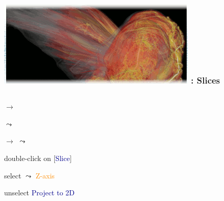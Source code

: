 \begin{frame}
\frametitle{\href{https://wci.llnl.gov/simulation/computer-codes/visit/}{\includegraphics[height=.85cm]{figs/visit-logos/VisIt-03}} \hspace{-.85cm}{\bf \textcolor{lightgray}{VisIt}}: Slices}
\begin{columns}
\begin{column}{6.5cm}
\begin{beamerboxesrounded}[upper=block head,lower=block body,shadow=true]{}
	\textcolor{DarkBlue}{} 
			$\rightarrow$ \framebox{\bf \textcolor{DarkBlue}{Pseudocolor}}

			\hspace{5mm}
			$\leadsto$ \framebox{\textcolor{DarkGreen}{grad\_magnitude}}

	\pause
	\textcolor{DarkBlue}{} 
			$\rightarrow$ 
			$\leadsto$ \framebox{\textcolor{DarkBlue}{\bf Slicing}}

	\pause
	\vspace{2mm}
	\textcolor{DarkBlue}{} 
		double-click on [\textcolor{DarkBlue}{Slice}]

	\vspace{.75mm}
	\hspace{3.5mm}
		select $\leadsto$ \textcolor{DarkOrange}{Z-axis}

	\hspace{3.5mm}
		unselect \textcolor{DarkBlue}{Project to 2D}

	\hspace{3.5mm}

	\hspace{3.5mm}


\end{beamerboxesrounded}
\end{column}
\end{columns}
\end{frame}
